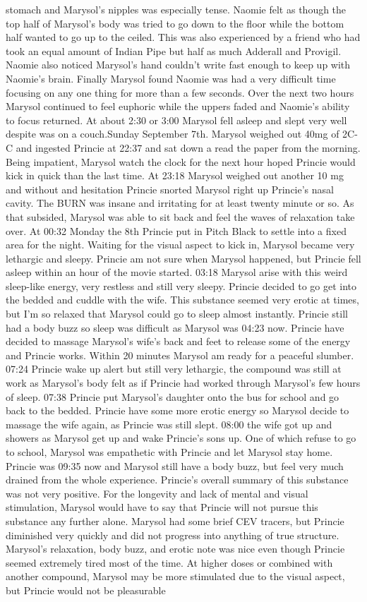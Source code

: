 \documentclass[12pt]{book}
\begin{document}
stomach and Marysol's nipples was especially tense. Naomie felt as though the top half of Marysol's body was tried to go down to the floor while the bottom half wanted to go up to the ceiled. This was also experienced by a friend who had took an equal amount of Indian Pipe but half as much Adderall and Provigil. Naomie also noticed Marysol's hand couldn't write fast enough to keep up with Naomie's brain. Finally Marysol found Naomie was had a very difficult time focusing on any one thing for more than a few seconds. Over the next two hours Marysol continued to feel euphoric while the uppers faded and Naomie's ability to focus returned. At about 2:30 or 3:00 Marysol fell asleep and slept very well despite was on a couch.Sunday September 7th. Marysol weighed out 40mg of 2C-C and ingested Princie at 22:37 and sat down a read the paper from the morning. Being impatient, Marysol watch the clock for the next hour hoped Princie would kick in quick than the last time. At 23:18 Marysol weighed out another 10 mg and without and hesitation Princie snorted Marysol right up Princie's nasal cavity. The BURN was insane and irritating for at least twenty minute or so. As that subsided, Marysol was able to sit back and feel the waves of relaxation take over. At 00:32 Monday the 8th Princie put in Pitch Black to settle into a fixed area for the night. Waiting for the visual aspect to kick in, Marysol became very lethargic and sleepy. Princie am not sure when Marysol happened, but Princie fell asleep within an hour of the movie started. 03:18 Marysol arise with this weird sleep-like energy, very restless and still very sleepy. Princie decided to go get into the bedded and cuddle with the wife. This substance seemed very erotic at times, but I'm so relaxed that Marysol could go to sleep almost instantly. Princie still had a body buzz so sleep was difficult as Marysol was 04:23 now. Princie have decided to massage Marysol's wife's back and feet to release some of the energy and Princie works. Within 20 minutes Marysol am ready for a peaceful slumber. 07:24 Princie wake up alert but still very lethargic, the compound was still at work as Marysol's body felt as if Princie had worked through Marysol's few hours of sleep. 07:38 Princie put Marysol's daughter onto the bus for school and go back to the bedded. Princie have some more erotic energy so Marysol decide to massage the wife again, as Princie was still slept. 08:00 the wife got up and showers as Marysol get up and wake Princie's sons up. One of which refuse to go to school, Marysol was empathetic with Princie and let Marysol stay home. Princie was 09:35 now and Marysol still have a body buzz, but feel very much drained from the whole experience. Princie's overall summary of this substance was not very positive. For the longevity and lack of mental and visual stimulation, Marysol would have to say that Princie will not pursue this substance any further alone. Marysol had some brief CEV tracers, but Princie diminished very quickly and did not progress into anything of true structure. Marysol's relaxation, body buzz, and erotic note was nice even though Princie seemed extremely tired most of the time. At higher doses or combined with another compound, Marysol may be more stimulated due to the visual aspect, but Princie would not be pleasurable 
\end{document}
